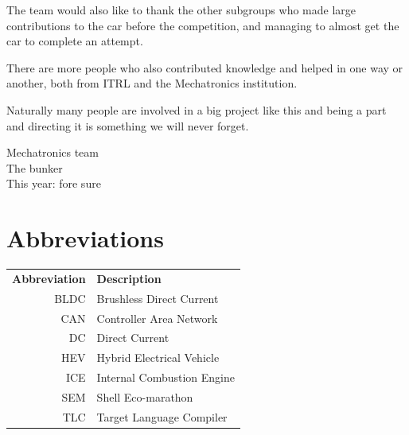 \documentclass[a4paper, 12pt]{report}
\begin{document}
The team would also like to thank the other subgroups who made large contributions to the car before the competition, and managing to almost get the car to complete an attempt.

There are more people who also contributed knowledge and helped in one way or another, both from ITRL and the Mechatronics institution.

Naturally many people are involved in a big project like this and being a part and directing it is something we will never forget.

\begin{flushright}Mechatronics team \\ The bunker \\This year: fore sure \end{flushright}

\clearpage
\setcounter{tocdepth}{1}
\tableofcontents

\chapter*{Abbreviations}
\noindent{}\begin{tabular}{r  l}
\textbf{Abbreviation} 	& \textbf{Description} \vspace{.5em} \\
BLDC	&Brushless Direct Current\\
CAN	 	&Controller Area Network\\
DC		&Direct Current\\
HEV     &Hybrid Electrical Vehicle\\
ICE 	&Internal Combustion Engine\\
SEM		&Shell Eco-marathon\\
TLC		&Target Language Compiler\\

\end{tabular}

\clearpage
{}












\end{document}
